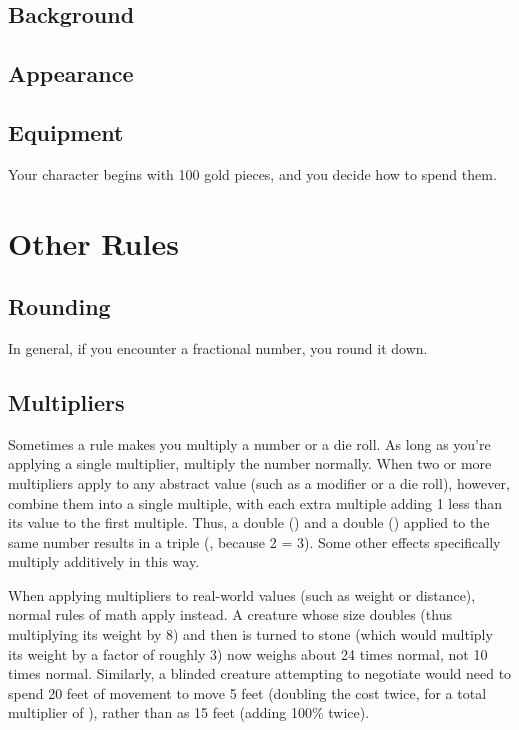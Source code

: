     \subsection{Background}

    \subsection{Appearance}

    \subsection{Equipment}
        Your character begins with 100 gold pieces, and you decide how to spend them.

\section{Other Rules}

    \subsection{Rounding}
        In general, if you encounter a fractional number, you round it down.

    \subsection{Multipliers}
        Sometimes a rule makes you multiply a number or a die roll.
        As long as you're applying a single multiplier, multiply the number normally.
        When two or more multipliers apply to any abstract value (such as a modifier or a die roll), however, combine them into a single multiple, with each extra multiple adding 1 less than its value to the first multiple.
        Thus, a double () and a double () applied to the same number results in a triple (, because 2  = 3).
        Some other effects specifically multiply additively in this way.

        When applying multipliers to real-world values (such as weight or distance), normal rules of math apply instead.
        A creature whose size doubles (thus multiplying its weight by 8) and then is turned to stone (which would multiply its weight by a factor of roughly 3) now weighs about 24 times normal, not 10 times normal.
        Similarly, a blinded creature attempting to negotiate  would need to spend 20 feet of movement to move 5 feet (doubling the cost twice, for a total multiplier of ), rather than as 15 feet (adding 100\% twice).
